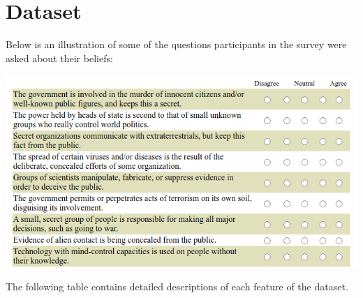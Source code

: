\documentclass[11pt]{article}
\begin{document}
\section*{Dataset}
Below is an illustration of some of the questions participants in the survey were asked about their beliefs:\\
\begin{center}
\includegraphics[scale=1.1]{"../survey.png"}\\
\end{center}
The following table contains detailed descriptions of each feature of the dataset.
\newpage
\end{document}
